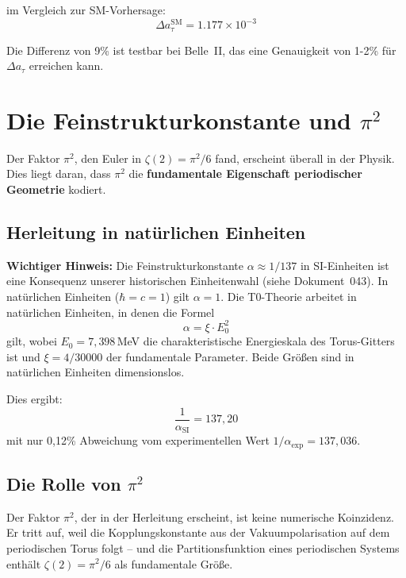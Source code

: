 	im Vergleich zur SM-Vorhersage:
	\begin{equation}
		\Delta a_\tau^{\text{SM}} = 1.177 \times 10^{-3}
	\end{equation}
	
	Die Differenz von 9\% ist testbar bei Belle~II, das eine Genauigkeit von 1-2\% für $\Delta a_\tau$ erreichen kann.
	
	
	\section{Die Feinstrukturkonstante und $\pi^2$}
	
	Der Faktor $\pi^2$, den Euler in $\zeta(2) = \pi^2/6$ fand, erscheint überall in der Physik. Dies liegt daran, dass $\pi^2$ die \textbf{fundamentale Eigenschaft periodischer Geometrie} kodiert.
	
	\subsection{Herleitung in natürlichen Einheiten}
	
	\textbf{Wichtiger Hinweis:} Die Feinstrukturkonstante $\alpha \approx 1/137$ in SI-Einheiten ist eine Konsequenz unserer historischen Einheitenwahl (siehe Dokument~043). In natürlichen Einheiten ($\hbar = c = 1$) gilt $\alpha = 1$. Die T0-Theorie arbeitet in natürlichen Einheiten, in denen die Formel
	\begin{equation}
		\alpha = \xi \cdot E_0^2
		\label{eq:alpha-derivation}
	\end{equation}
	gilt, wobei $E_0 = 7{,}398$\,MeV die charakteristische Energieskala des Torus-Gitters ist und $\xi = 4/30000$ der fundamentale Parameter. Beide Größen sind in natürlichen Einheiten dimensionslos.
	
	Dies ergibt:
	\begin{equation}
		\frac{1}{\alpha_\text{SI}} = 137{,}20
	\end{equation}
	mit nur 0{,}12\% Abweichung vom experimentellen Wert $1/\alpha_\text{exp} = 137{,}036$.
	
	\subsection{Die Rolle von $\pi^2$}
	
	Der Faktor $\pi^2$, der in der Herleitung erscheint, ist keine numerische Koinzidenz. Er tritt auf, weil die Kopplungskonstante aus der Vakuumpolarisation auf dem periodischen Torus folgt -- und die Partitionsfunktion eines periodischen Systems enthält $\zeta(2) = \pi^2/6$ als fundamentale Größe.
	
